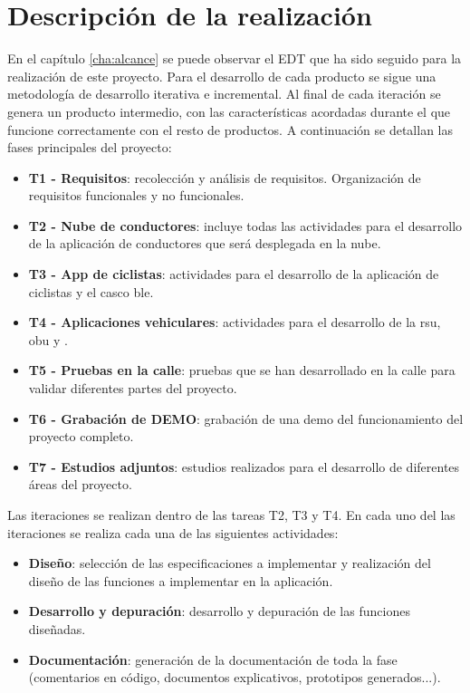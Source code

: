\chapter{Descripción de la realización}\label{cha:descripcion_realizacion}
En el capítulo \ref{cha:alcance} se puede observar el EDT que ha sido seguido para
la realización de este proyecto. Para el desarrollo de cada producto se sigue una
metodología de desarrollo iterativa e incremental. Al final de cada iteración se
genera un producto intermedio, con las características acordadas durante el que
funcione correctamente con el resto de productos.  A continuación se detallan las
fases principales del proyecto:
\begin{itemize}
	\item \textbf{T1 - Requisitos}: recolección y análisis de requisitos. Organización
	de requisitos funcionales y no funcionales.

	\item \textbf{T2 - Nube de conductores}: incluye todas las actividades para el
	desarrollo de la aplicación de conductores que será desplegada en la nube.

	\item \textbf{T3 - App de ciclistas}: actividades para el desarrollo de la
	aplicación de ciclistas y el casco \gls{ble}.

	\item \textbf{T4 - Aplicaciones vehiculares}: actividades para el desarrollo
	de la \gls{rsu}, \gls{obu} y .

	\item \textbf{T5 - Pruebas en la calle}: pruebas que se han desarrollado en la
	calle para validar diferentes partes del proyecto.

	\item \textbf{T6 - Grabación de DEMO}: grabación de una demo del funcionamiento del
	proyecto completo.

	\item \textbf{T7 - Estudios adjuntos}: estudios realizados para el desarrollo de
	diferentes áreas del proyecto.
\end{itemize}

Las iteraciones se realizan dentro de las tareas T2, T3 y T4. En cada uno del las
iteraciones se realiza cada una de las siguientes actividades:
\begin{itemize}
	\item \textbf{Diseño}: selección de las especificaciones a implementar y realización
	del diseño de las funciones a implementar en la aplicación.

	\item \textbf{Desarrollo y depuración}: desarrollo y depuración de las funciones
	diseñadas.

	\item \textbf{Documentación}: generación de la documentación de toda la fase
	(comentarios en código, documentos explicativos, prototipos generados...).
\end{itemize}



